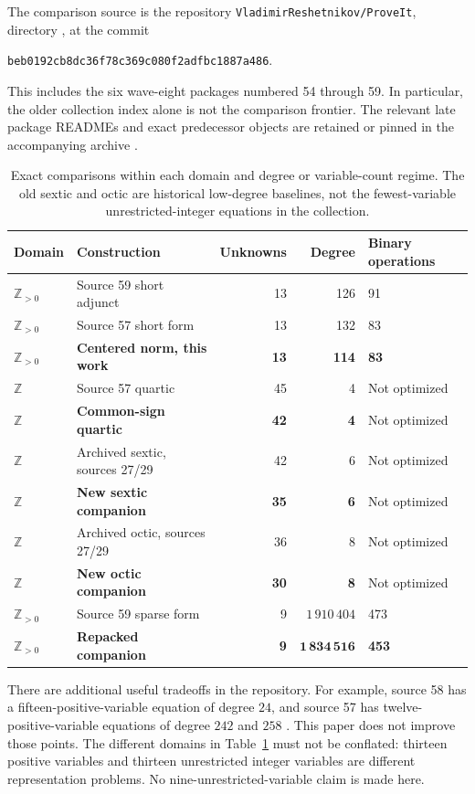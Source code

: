 \documentclass[11pt,a4paper]{article}
\numberwithin{equation}{section}
\newcommand{\Z}{\mathbb Z}
\newcommand{\Zpos}{\mathbb Z_{>0}}
\newcommand{\snapshot}{\texttt{beb0192cb8dc36f78c369c080f2adfbc1887a486}}
\begin{document}
The comparison source is the repository
\texttt{VladimirReshetnikov/ProveIt}, directory
,
at the commit
\begin{center}\snapshot.\end{center}
This includes the six wave-eight packages numbered 54 through 59. In
particular, the older collection index alone is not the comparison
frontier. The relevant late package READMEs and exact predecessor objects
are retained or pinned in the accompanying archive
\cite{repo57,repo58,repo59}.

\begin{table}[htbp]
\centering
\small
\begin{tabular}{@{}llrrl@{}}
\toprule
Domain & Construction & Unknowns & Degree & Binary operations\\
\midrule
$\Zpos$ & Source 59 short adjunct & 13 & 126 & 91\\
$\Zpos$ & Source 57 short form & 13 & 132 & 83\\
$\Zpos$ & \textbf{Centered norm, this work} & \textbf{13} & \textbf{114} & \textbf{83}\\
\addlinespace
$\Z$ & Source 57 quartic & 45 & 4 & Not optimized\\
$\Z$ & \textbf{Common-sign quartic} & \textbf{42} & \textbf{4} & Not optimized\\
$\Z$ & Archived sextic, sources 27/29 & 42 & 6 & Not optimized\\
$\Z$ & \textbf{New sextic companion} & \textbf{35} & \textbf{6} & Not optimized\\
$\Z$ & Archived octic, sources 27/29 & 36 & 8 & Not optimized\\
$\Z$ & \textbf{New octic companion} & \textbf{30} & \textbf{8} & Not optimized\\
\addlinespace
$\Zpos$ & Source 59 sparse form & 9 & $1\,910\,404$ & 473\\
$\Zpos$ & \textbf{Repacked companion} & \textbf{9} & $\boldsymbol{1\,834\,516}$ & \textbf{453}\\
\bottomrule
\end{tabular}
\caption{Exact comparisons within each domain and degree or variable-count
regime. The old sextic and octic are historical low-degree baselines, not
the fewest-variable unrestricted-integer equations in the collection.}
\label{tab:results}
\end{table}

There are additional useful tradeoffs in the repository. For example,
source 58 has a fifteen-positive-variable equation of degree $24$, and
source 57 has twelve-positive-variable equations of degree $242$ and
$258$ \cite{repo57,repo58}. This paper does not improve those points.
The different domains in Table~\ref{tab:results} must not be conflated:
thirteen positive variables and thirteen unrestricted integer variables
are different representation problems. No nine-unrestricted-variable
claim is made here.
\end{document}
